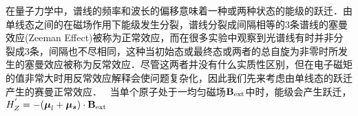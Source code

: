 
在量子力学中，谱线的频率和波长的偏移意味着一种或两种状态的能级的跃迁．由单线态之间的在磁场作用下能级发生分裂，谱线分裂成间隔相等的3条谱线的塞曼效应(Zeeman Effect)被称为正常效应，而在很多实验中观察到光谱线有时并非分裂成3条，间隔也不尽相同，这种当初始态或最终态或两者的总自旋为非零时所发生的塞曼效应被称为反常效应．尽管这两者并没有什么实质性区别，但在电子磁矩的值非常大时用反常效应解释会使问题复杂化，因此我们先来考虑由单线态的跃迁产生的赛曼正常效应．
\
当单个原子处于一均匀磁场$\mathbf{B}_{\rm{ext}}$中时，能级会产生跃迁，
$H_Z^{'} = -(\boldsymbol{\mu}_l+\boldsymbol{\mu_s})\cdot \mathbf{B}_{\rm{ext}}$